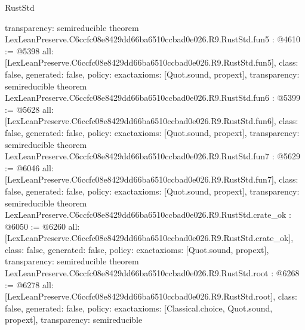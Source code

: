 \begin{lexlean}{RustStd}
\begin{coremodule}
{  transparency: semireducible
}
theorem LexLeanPreserve.C6ccfc08e8429dd66ba6510ccbad0e026.R9.RustStd.fun5 : @4610 := @5398 {
  all: [LexLeanPreserve.C6ccfc08e8429dd66ba6510ccbad0e026.R9.RustStd.fun5],
  class: false,
  generated: false,
  policy: exact{axioms: [Quot.sound, propext]},
  transparency: semireducible
}
theorem LexLeanPreserve.C6ccfc08e8429dd66ba6510ccbad0e026.R9.RustStd.fun6 : @5399 := @5628 {
  all: [LexLeanPreserve.C6ccfc08e8429dd66ba6510ccbad0e026.R9.RustStd.fun6],
  class: false,
  generated: false,
  policy: exact{axioms: [Quot.sound, propext]},
  transparency: semireducible
}
theorem LexLeanPreserve.C6ccfc08e8429dd66ba6510ccbad0e026.R9.RustStd.fun7 : @5629 := @6046 {
  all: [LexLeanPreserve.C6ccfc08e8429dd66ba6510ccbad0e026.R9.RustStd.fun7],
  class: false,
  generated: false,
  policy: exact{axioms: [Quot.sound, propext]},
  transparency: semireducible
}
theorem LexLeanPreserve.C6ccfc08e8429dd66ba6510ccbad0e026.R9.RustStd.crate_ok : @6050 := @6260 {
  all: [LexLeanPreserve.C6ccfc08e8429dd66ba6510ccbad0e026.R9.RustStd.crate_ok],
  class: false,
  generated: false,
  policy: exact{axioms: [Quot.sound, propext]},
  transparency: semireducible
}
theorem LexLeanPreserve.C6ccfc08e8429dd66ba6510ccbad0e026.R9.RustStd.root : @6268 := @6278 {
  all: [LexLeanPreserve.C6ccfc08e8429dd66ba6510ccbad0e026.R9.RustStd.root],
  class: false,
  generated: false,
  policy: exact{axioms: [Classical.choice, Quot.sound, propext]},
  transparency: semireducible
}


\end{coremodule}
\end{lexlean}
